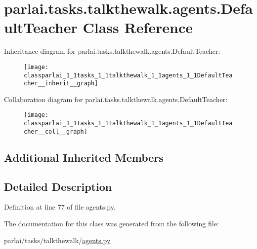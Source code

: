 \hypertarget{classparlai_1_1tasks_1_1talkthewalk_1_1agents_1_1DefaultTeacher}{}\section{parlai.\+tasks.\+talkthewalk.\+agents.\+Default\+Teacher Class Reference}
\label{classparlai_1_1tasks_1_1talkthewalk_1_1agents_1_1DefaultTeacher}


Inheritance diagram for parlai.\+tasks.\+talkthewalk.\+agents.\+Default\+Teacher\+:
\nopagebreak
\begin{figure}[H]
\begin{center}
\leavevmode
\texttt{[image: classparlai\_1\_1tasks\_1\_1talkthewalk\_1\_1agents\_1\_1DefaultTeacher\_\_inherit\_\_graph]}
\end{center}
\end{figure}


Collaboration diagram for parlai.\+tasks.\+talkthewalk.\+agents.\+Default\+Teacher\+:
\nopagebreak
\begin{figure}[H]
\begin{center}
\leavevmode
\texttt{[image: classparlai\_1\_1tasks\_1\_1talkthewalk\_1\_1agents\_1\_1DefaultTeacher\_\_coll\_\_graph]}
\end{center}
\end{figure}
\subsection*{Additional Inherited Members}


\subsection{Detailed Description}


Definition at line 77 of file agents.\+py.



The documentation for this class was generated from the following file\+:\begin{DoxyCompactItemize}
\item 
parlai/tasks/talkthewalk/\hyperlink{parlai_2tasks_2talkthewalk_2agents_8py}{agents.\+py}\end{DoxyCompactItemize}
